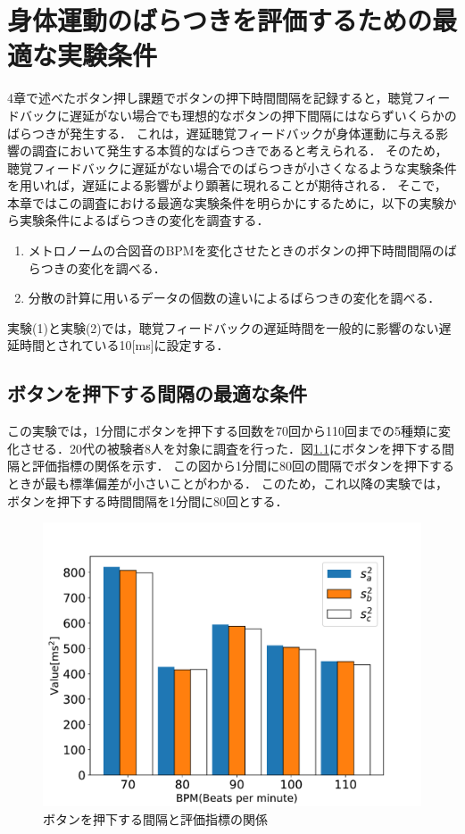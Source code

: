 \chapter{身体運動のばらつきを評価するための最適な実験条件}
4章で述べたボタン押し課題でボタンの押下時間間隔を記録すると，聴覚フィードバックに遅延がない場合でも理想的なボタンの押下間隔にはならずいくらかのばらつきが発生する．
これは，遅延聴覚フィードバックが身体運動に与える影響の調査において発生する本質的なばらつきであると考えられる．
そのため，聴覚フィードバックに遅延がない場合でのばらつきが小さくなるような実験条件を用いれば，遅延による影響がより顕著に現れることが期待される．
そこで，本章ではこの調査における最適な実験条件を明らかにするために，以下の実験から実験条件によるばらつきの変化を調査する．
\begin{enumerate}[leftmargin=*, label=実験(\arabic*)] %
  \item メトロノームの合図音のBPMを変化させたときのボタンの押下時間間隔のばらつきの変化を調べる．
  \item 分散の計算に用いるデータの個数の違いによるばらつきの変化を調べる．
\end{enumerate}
実験(1)と実験(2)では，聴覚フィードバックの遅延時間を一般的に影響のない遅延時間とされている10[ms]に設定する．
\section{ボタンを押下する間隔の最適な条件}
この実験では，1分間にボタンを押下する回数を70回から110回までの5種類に変化させる．20代の被験者8人を対象に調査を行った．図\ref{fig:bpm}にボタンを押下する間隔と評価指標の関係を示す．
この図から1分間に80回の間隔でボタンを押下するときが最も標準偏差が小さいことがわかる．
このため，これ以降の実験では，ボタンを押下する時間間隔を1分間に80回とする．
\begin{figure}[b]
  \centering
  \includegraphics[scale=0.6]{figures/Yobi/Var/BPM-Change-Var.pdf}
  \caption{ボタンを押下する間隔と評価指標の関係}
  \label{fig:bpm}
\end{figure}
